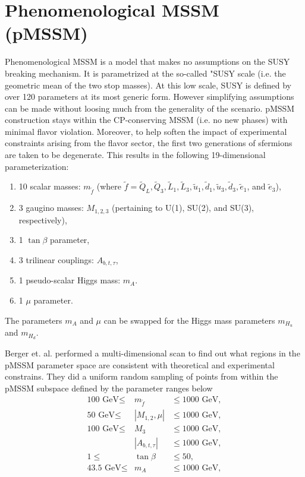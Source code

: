 \section{Phenomenological MSSM (pMSSM)}

Phenomenological MSSM is a model that makes no assumptions on the SUSY breaking mechanism.  It is parametrized at the so-called "SUSY scale (i.e. the geometric mean of the two stop masses).  At this low scale, SUSY is defined by over 120 parameters at its most generic form.  However simplifying assumptions can be made without loosing much from the generality of the scenario.  pMSSM construction stays within the CP-conserving MSSM (i.e. no new phases) with minimal flavor violation.  Moreover, to help soften the impact of experimental constraints arising from the flavor sector, the first two generations of sfermions are taken to be degenerate.  This results in the following 19-dimensional parameterization:

\begin{enumerate}
         \item 10 scalar masses: $m_{\tilde{f}}$ (where 
$\tilde{f} = \tilde{Q}_L, \tilde{Q}_3, \tilde{L}_1, \tilde{L}_3, 
\tilde{u}_1, \tilde{d}_1, 
\tilde{u}_3, \tilde{d}_3, \tilde{e}_1$, and $\tilde{e}_3$),

         \item 3 gaugino masses: $M_{1,2,3}$ (pertaining to U(1), SU(2), 
and SU(3), respectively),
         
         \item 1 $\tan\beta$ parameter,
         
         \item 3 trilinear couplings: $A_{b, t, \tau}$,
         
         \item 1 pseudo-scalar Higgs mass: $m_A$.
         
         \item 1 $\mu$ parameter. 
         
\end{enumerate}
The parameters $m_A$ and $\mu$ can be swapped for the Higgs mass parameters 
$m_{H_u}$ and $m_{H_d}$.

Berger et. al. performed a multi-dimensional scan to find out what regions in the pMSSM parameter space are consistent with theoretical and experimental constrains.  They did a uniform random sampling of points from within the pMSSM subspace defined by the parameter ranges below
\begin{eqnarray}
  \mbox{100 GeV} \leq 	& m_{\tilde{f}} 	& \leq \mbox{1000 GeV}, 	
  \\ \nonumber
  \mbox{50 GeV}  \leq	& |M_{1,2},\mu| & \leq \mbox{1000 GeV}, 	
    \\ \nonumber
    \mbox{100 GeV} \leq	& M_3 		& \leq  \mbox{1000 GeV},
    \\ \nonumber
	& |A_{b,t,\tau}| & \leq \mbox{1000 GeV}, 		
    \\ \nonumber
    1  \leq				& \tan\beta		& \leq 50,				
    \\ \nonumber
    \mbox{43.5 GeV}	\leq	& m_A			& \leq \mbox{1000 GeV},
\end{eqnarray}


